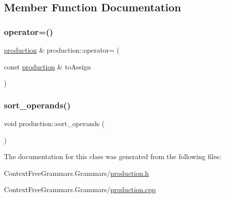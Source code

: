 \subsection{Member Function Documentation}
\mbox{\label{classproduction_ae2bd3607ef864c3f348bc25c1c547304}} 
\subsubsection{\texorpdfstring{operator=()}{operator=()}}
{\footnotesize\ttfamily \mbox{\hyperlink{classproduction}{production}} \& production\+::operator= (\begin{DoxyParamCaption}\item[{const \mbox{\hyperlink{classproduction}{production}} \&}]{to\+Assign }\end{DoxyParamCaption})}

\mbox{\label{classproduction_a7f26dd5ebd1a4913370d0e5f4d506dcc}} 
\subsubsection{\texorpdfstring{sort\_operands()}{sort\_operands()}}
{\footnotesize\ttfamily void production\+::sort\+\_\+operands (\begin{DoxyParamCaption}{ }\end{DoxyParamCaption})}



The documentation for this class was generated from the following files\+:\begin{DoxyCompactItemize}
\item 
Context\+Free\+Grammars.\+Grammars/\mbox{\hyperlink{production_8h}{production.\+h}}\item 
Context\+Free\+Grammars.\+Grammars/\mbox{\hyperlink{production_8cpp}{production.\+cpp}}\end{DoxyCompactItemize}

